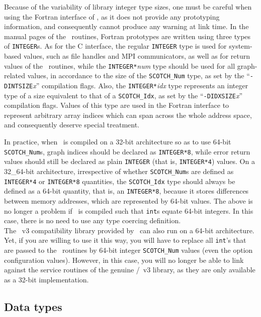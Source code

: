 Because of the variability of library integer type sizes, one must be
careful when using the Fortran interface of \scotch, as it does not
provide any prototyping information, and consequently cannot produce
any warning at link time. In the manual pages of the
\libscotch\ routines, Fortran prototypes are written using three types
of {\tt INTEGER}s. As for the C interface, the regular {\tt INTEGER}
type is used for system-based values, such as file handles and MPI
communicators, as well as for return values of the
\libscotch\ routines, while the {\tt INTEGER*}{\it num} type
should be used for all graph-related values, in accordance to the size
of the {\tt SCOTCH\_\lbt Num} type, as set by the
``{\tt -DINTSIZE}{\it x}'' compilation flags. Also, the
{\tt INTEGER*}{\it idx} type represents an integer type of a size
equivalent to that of a {\tt SCOTCH\_\lbt Idx}, as set by the
``{\tt -DIDXSIZE}{\it x}'' compilation flags. Values of this type are
used in the Fortran interface to represent arbitrary array indices
which can span across the whole address space, and consequently
deserve special treatment.

In practice, when \scotch\ is compiled on a 32-bit architecture so as
to use 64-bit {\tt SCOTCH\_\lbt Num}s, graph indices should be
declared as {\tt INTEGER*8}, while error return values
should still be declared as plain {\tt INTEGER} (that is,
{\tt INTEGER*4}) values. On a 32\_64-bit architecture, irrespective of
whether {\tt SCOTCH\_\lbt Num}s are defined as {\tt INTEGER*4}
or {\tt INTEGER*8} quantities, the {\tt SCOTCH\_\lbt Idx} type
should always be defined as a 64-bit quantity, that is, an
{\tt INTEGER*8}, because it stores differences between memory
addresses, which are represented by 64-bit values.
The above is no longer a problem if \scotch\ is compiled such that
{\tt int}s equate 64-bit integers. In this case, there is no need to
use any type coercing definition.
\\

The \metis\ v3 compatibility library provided by \scotch\ can also
run on a 64-bit architecture. Yet, if you are willing to use it this
way, you will have to replace all {\tt int}'s that are passed to the
\metis\ routines by 64-bit integer {\tt SCOTCH\_\lbt Num} values (even
the option configuration values). However, in this case, you will no
longer be able to link against the service routines of the genuine
\metis/\parmetis\ v3 library, as they are only available as a 32-bit
implementation.

\subsection{Data types}

